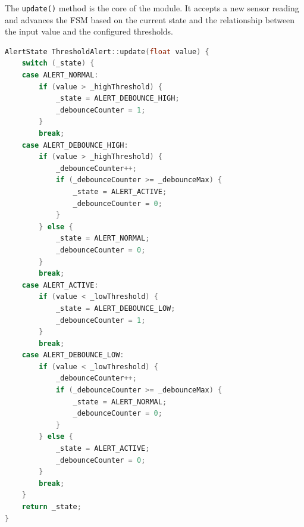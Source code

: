 The \texttt{update()} method is the core of the module. It accepts a new sensor reading and advances the FSM based on the current state and the relationship between the input value and the configured thresholds.

\begin{lstlisting}[language=C++, caption=ThresholdAlert::update() --- core FSM logic, label=lst:threshold_update]
AlertState ThresholdAlert::update(float value) {
    switch (_state) {
    case ALERT_NORMAL:
        if (value > _highThreshold) {
            _state = ALERT_DEBOUNCE_HIGH;
            _debounceCounter = 1;
        }
        break;
    case ALERT_DEBOUNCE_HIGH:
        if (value > _highThreshold) {
            _debounceCounter++;
            if (_debounceCounter >= _debounceMax) {
                _state = ALERT_ACTIVE;
                _debounceCounter = 0;
            }
        } else {
            _state = ALERT_NORMAL;
            _debounceCounter = 0;
        }
        break;
    case ALERT_ACTIVE:
        if (value < _lowThreshold) {
            _state = ALERT_DEBOUNCE_LOW;
            _debounceCounter = 1;
        }
        break;
    case ALERT_DEBOUNCE_LOW:
        if (value < _lowThreshold) {
            _debounceCounter++;
            if (_debounceCounter >= _debounceMax) {
                _state = ALERT_NORMAL;
                _debounceCounter = 0;
            }
        } else {
            _state = ALERT_ACTIVE;
            _debounceCounter = 0;
        }
        break;
    }
    return _state;
}
\end{lstlisting}

